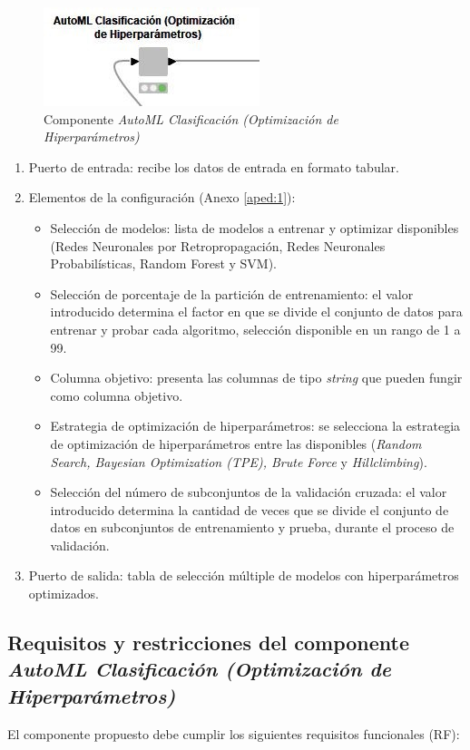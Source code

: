 \begin{figure}[H]
	\centering
	\includegraphics[width=0.35\linewidth]{"figuras/capi 2/hpo/automl-componente-hpo"}
	\caption[Componente AutoML Clasificación (Optimización de Hiperparámetros)]{Componente \textit{AutoML Clasificación (Optimización de Hiperparámetros)}}
	\label{fig:automl-componente-hpo}
\end{figure}
\begin{enumerate}
	\item Puerto de entrada: recibe los datos de entrada en formato tabular.
	\item Elementos de la configuración (Anexo \ref{aped:1}):
	\begin{itemize}
		\item Selección de modelos: lista de modelos a entrenar y optimizar disponibles (Redes Neuronales por Retropropagación, Redes Neuronales Probabilísticas, Random Forest y SVM).
		\item Selección de porcentaje de la partición de entrenamiento: el valor introducido determina el factor en que se divide el conjunto de datos para entrenar y probar cada algoritmo, selección disponible en un rango de 1 a 99. 
		\item Columna objetivo: presenta las columnas de tipo \textit{string} que pueden fungir como columna objetivo.
		\item Estrategia de optimización de hiperparámetros: se selecciona la estrategia de optimización de hiperparámetros entre las disponibles (\textit{Random Search, Bayesian Optimization (TPE), Brute Force} y \textit{Hillclimbing}).
		\item Selección del número de subconjuntos de la validación cruzada: el valor introducido determina la cantidad de veces que se divide el conjunto de datos en subconjuntos de entrenamiento y prueba, durante el proceso de validación.
	\end{itemize}
	\item Puerto de salida: tabla de selección múltiple de modelos con hiperparámetros optimizados.
\end{enumerate}

\subsection{Requisitos y restricciones del componente \textit{AutoML Clasificación (Optimización de Hiperparámetros)}}
El componente propuesto debe cumplir los siguientes requisitos funcionales (RF):

